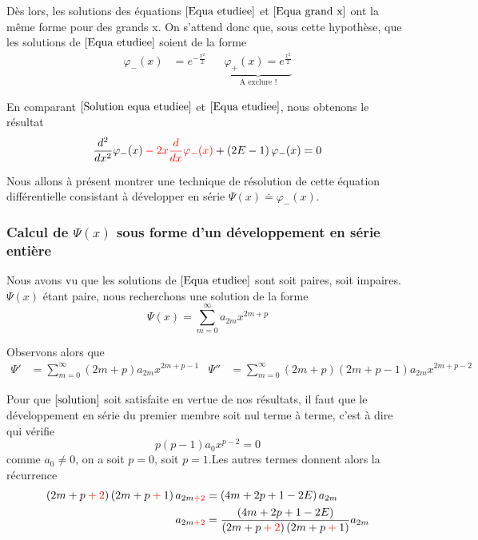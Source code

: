 \documentclass[../Notesdecours.tex]{subfiles}
\begin{document}
Dès lors, les solutions des équations $\eqref{Equa etudiee}$ et $\eqref{Equa grand x}$ ont la même forme pour des grands x. On s'attend donc que, sous cette hypothèse, que les solutions de $\eqref{Equa etudiee}$ soient de la forme
\begin{align}
    \label{Solution equa etudiee}
    \varphi_-(x) &= e^{-\frac{x^2}{2}} & &\underbrace{\varphi_+(x) = e^{\frac{x^2}{2}}}_{\text{A exclure !}}
\end{align}

En comparant $\eqref{Solution equa etudiee}$ et $\eqref{Equa etudiee}$, nous obtenons le résultat
\begin{equation}
    \label{solution}
    \frac{d^2}{dx^2}\varphi_-(x) \color{red}- 2x\frac{d}{dx}\varphi_-(x) \color{black} + \left(2E-1\right)\varphi_-(x) = 0
\end{equation}

Nous allons à présent montrer une technique de résolution de cette équation différentielle consistant à développer en série $\Psi(x) \doteq \varphi_-(x)$.

\subsubsection{Calcul de $\Psi(x)$ sous forme d'un développement en série entière}

Nous avons vu que les solutions de $\eqref{Equa etudiee}$ sont soit paires, soit impaires. $\Psi (x)$ étant paire, nous recherchons une solution de la forme
\begin{equation}
    \Psi(x) = \sum_{m = 0}^\infty a_{2m}x^{2m+p}
\end{equation}

Observons alors que
\begin{align}
    \Psi' &= \sum_{m = 0}^{\infty}\left(2m+p\right)a_{2m}x^{2m+p-1} & \Psi'' &= \sum_{m = 0}^{\infty}\left(2m+p\right)\left(2m+p-1\right)a_{2m}x^{2m+p-2}
\end{align}

Pour que $\eqref{solution}$ soit satisfaite en vertue de nos résultats, il faut que le développement en série du premier membre soit nul terme à terme, c'est à dire qui vérifie
\begin{equation}
    p(p-1)a_0x^{p-2} = 0
\end{equation}
comme $a_0 \neq 0$, on a soit $p = 0$, soit $p = 1$.Les autres termes donnent alors la récurrence
\begin{align}
    \left(2m+p\color{red}+2\color{black}\right)\left(2m+p\color{red}+\color{black}1\right)a_{2m\color{red}+2\color{black}}&= \left(4m+2p+1-2E\right)a_{2m} \\
    a_{2m\color{red}+2\color{black}} &= \frac{\left(4m+2p+1-2E\right)}{\left(2m+p\color{red}+2\color{black}\right)\left(2m+p\color{red}+\color{black}1\right)}a_{2m}  \label{recurrence}
\end{align}
\end{document}

